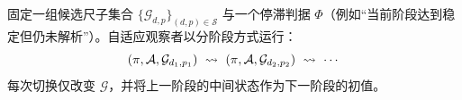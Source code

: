 \begin{definition}
固定一组候选尺子集合 \(\{\mathcal G_{d,p}\}_{(d,p)\in \mathcal S}\) 与一个停滞判据 \(\Phi\)（例如“当前阶段达到稳定但仍未解析”）。自适应观察者以分阶段方式运行：
\[
(\proj,\mathcal A,\mathcal G_{d_1,p_1})\ \rightsquigarrow\ (\proj,\mathcal A,\mathcal G_{d_2,p_2})\ \rightsquigarrow\ \cdots
\]
每次切换仅改变 \(\mathcal G\)，并将上一阶段的中间状态作为下一阶段的初值。
\end{definition}

